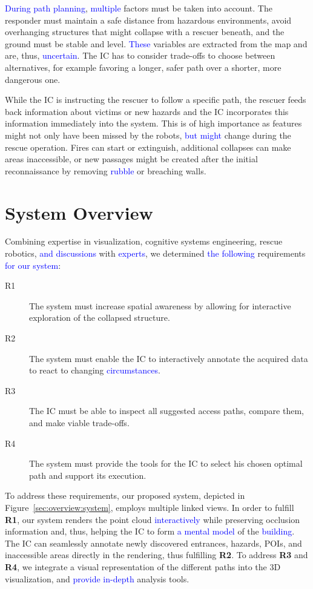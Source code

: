 \documentclass{egpubl}
\newcommand{\diff}[1]{\textcolor{blue}{#1}}
\begin{document}
\diff{During path planning}, \diff{multiple} factors must be taken into account. The responder must maintain a safe distance from hazardous environments, avoid overhanging structures that might collapse with a rescuer beneath, and the ground must be stable and level. \diff{These} variables are extracted from the map and are, thus, \diff{uncertain}. The IC has to consider trade-offs to choose between alternatives, for example favoring a longer, safer path over a shorter, more dangerous one.

While the IC is instructing the rescuer to follow a specific path, the rescuer feeds back information about victims or new hazards and the IC incorporates this information immediately into the system. This is of high importance as features might not only have been missed by the robots, \diff{but might} change during the rescue operation. Fires can start or extinguish, additional collapses can make areas inaccessible, or new passages might be created after the initial reconnaissance by removing \diff{rubble} or breaching walls.


\section{System Overview} \label{sec:overview}

Combining expertise in visualization, cognitive systems engineering, rescue robotics, \diff{and discussions} with \diff{experts}, we determined \diff{the following} requirements \diff{for our system}:
\begin{description}
\item[R1] The system must increase spatial awareness by allowing for interactive exploration of the collapsed structure.
\item[R2] The system must enable the IC to interactively annotate the acquired data to react to changing \diff{circumstances}.
\item[R3] The IC must be able to inspect all suggested access paths, compare them, and make viable trade-offs.
\item[R4] The system must provide the tools for the IC to select his chosen optimal path and support its execution.
\end{description}

To address these requirements, our proposed system, depicted in Figure~\ref{sec:overview:system}, employs multiple linked views. In order to fulfill {\bfseries R1}, our system renders the point cloud \diff{interactively} while preserving occlusion information and, thus, helping the IC to form \diff{a mental model} of the \diff{building}. The IC can seamlessly annotate newly discovered entrances, hazards, POIs, and inaccessible areas directly in the rendering, thus fulfilling {\bfseries R2}. To address {\bfseries R3} and {\bfseries R4}, we integrate a visual representation of the different paths into the 3D visualization, and \diff{provide in-depth} analysis tools.
\end{document}
